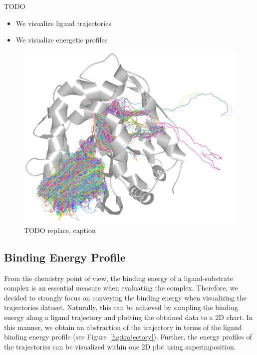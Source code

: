 \documentclass{vgtc}                          %
\begin{document}
TODO
\begin{itemize}
  \item We visualize ligand trajectories
  \item We visualize energetic profiles
\end{itemize}

\begin{figure}[htb]
  \centering
  \includegraphics[width=\columnwidth]{trajectories}
  \caption{TODO replace, caption}
  \label{fig:trajectories}
\end{figure}

\subsection{Binding Energy Profile}

From the chemistry point of view, the binding energy of a ligand-substrate complex is an essential measure when evaluating the complex.
Therefore, we decided to strongly focus on conveying the binding energy when visualizing the trajectories dataset.
Naturally, this can be achieved by sampling the binding energy along a ligand trajectory and plotting the obtained data to a 2D chart.
In this manner, we obtain an abstraction of the trajectory in terms of the ligand binding energy profile (see Figure~\ref{fig:trajectory}).
Further, the energy profiles of the trajectories can be visualized within one 2D plot using superimposition.
\end{document}
